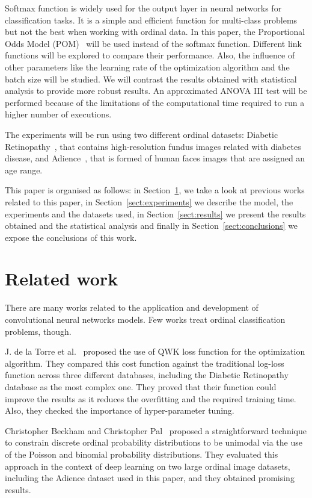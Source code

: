 \documentclass[journal]{IEEEtran}
\begin{document}
	Softmax function is widely used for the output layer in neural networks for classification tasks. It is a simple and efficient function for multi-class problems but not the best when working with ordinal data. In this paper, the Proportional Odds Model (POM)~\cite{gutierrez2016ordinal, agresti2010analysis} will be used instead of the softmax function. Different link functions will be explored to compare their performance. Also, the influence of other parameters like the learning rate of the optimization algorithm and the batch size will be studied. We will contrast the results obtained with statistical analysis to provide more robust results. An approximated ANOVA III test will be performed because of the limitations of the computational time required to run a higher number of executions.
	
	The experiments will be run using two different ordinal datasets: Diabetic Retinopathy~\cite{de2018weighted}, that contains high-resolution fundus images related with diabetes disease, and Adience~\cite{beckham2017unimodal}, that is formed of human faces images that are assigned an age range.
	
	This paper is organised as follows: in Section~\ref{sect:relatedwork}, we take a look at previous works related to this paper, in Section~\ref{sect:experiments} we describe the model, the experiments and the datasets used, in Section~\ref{sect:results} we present the results obtained and the statistical analysis and finally in Section~\ref{sect:conclusions} we expose the conclusions of this work.
	
	\section{Related work}
	\label{sect:relatedwork}
	There are many works related to the application and development of convolutional neural networks models. Few works treat ordinal classification problems, though.
	
	J. de la Torre et al.~\cite{de2018weighted} proposed the use of QWK loss function for the optimization algorithm. They compared this cost function against the traditional log-loss function across three different databases, including the Diabetic Retinopathy database as the most complex one. They proved that their function could improve the results as it reduces the overfitting and the required training time. Also, they checked the importance of hyper-parameter tuning.
	
	Christopher Beckham and Christopher Pal~\cite{beckham2017unimodal} proposed a straightforward technique to constrain discrete ordinal probability distributions to be unimodal via the use of the Poisson and binomial probability distributions. They evaluated this approach in the context of deep learning on two large ordinal image datasets, including the Adience dataset used in this paper, and they obtained promising results.
	
\end{document}
